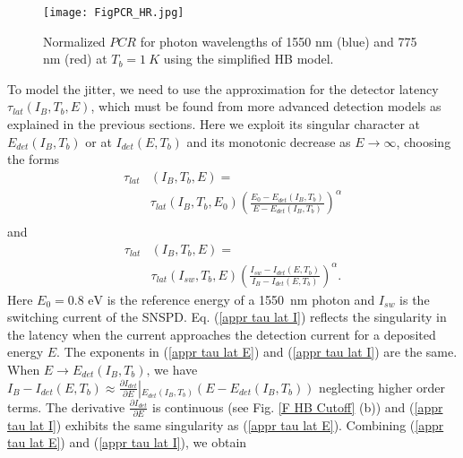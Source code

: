 \documentclass[%
reprint,
 amsmath,amssymb,
aps,
pra,
]{revtex4-1}
\begin{document}
\begin{figure} 
\texttt{[image: FigPCR\_HR.jpg]}
\caption{Normalized $PCR$ for photon wavelengths of 1550 nm (blue) and 775 nm (red) at \(T_b=1~K\) using the simplified HB model.}
\label{F HB PCR}
\end{figure}

\quad To model the jitter, we need to use the approximation for the detector latency 
\(\tau_{lat}\left(I_B,T_b,E\right)\), 
which must be found from more advanced detection models as explained in the previous sections. Here we exploit its singular character at
\(E_{det}\left(I_B,T_b\right)\)
or at 
\(I_{det}\left(E,T_b\right)\)
and its monotonic decrease as
\(E \rightarrow \infty\),
choosing the forms
\begin{equation}\label{appr tau lat E}
\begin{aligned}
\tau_{lat}&\left(I_B,T_b,E\right) = \\
&\tau_{lat}\left(I_B,T_b,E_0\right)\left(\frac{E_0-E_{det}\left(I_B,T_b\right)}{E-E_{det}\left(I_B,T_b\right)}\right)^\alpha \\
&{}
\end{aligned}
\end{equation}
and
\begin{equation}\label{appr tau lat I}
\begin{aligned}
\tau_{lat}&\left(I_B,T_b,E\right) = \\
&\tau_{lat}\left(I_{sw},T_b,E\right)\left(\frac{I_{sw}-I_{det}\left(E,T_b\right)}{I_B-I_{det}\left(E,T_b\right)}\right)^\alpha \text{.}
\end{aligned}
\end{equation}
Here
\(E_0 = 0.8\text{ eV}\) is the reference energy of a 1550~nm photon and \(I_{sw}\) is the switching current of the SNSPD.  Eq. (\ref{appr tau lat I}) reflects the singularity in the latency when the current approaches the detection current for a deposited energy \(E\). The exponents in (\ref{appr tau lat E}) and (\ref{appr tau lat I}) are the same. When 
\(E \rightarrow E_{det}\left(I_B, T_b\right)\text{,}\)
 we have 
\(I_B - I_{det}\left(E, T_b\right) \approx \frac{\partial I_{det}}{\partial E} \left|_{E_{det}\left(I_B,T_b\right)}\left(E - E_{det}\left(I_B, T_b\right)\right)\right. \)
neglecting higher order terms. The derivative $\displaystyle{\frac{\partial I_{det}}{\partial E}}$ is continuous (see Fig. \ref{F HB Cutoff} (b)) and (\ref{appr tau lat I}) exhibits the same singularity as (\ref{appr tau lat E}). Combining (\ref{appr tau lat E}) and (\ref{appr tau lat I}), we obtain
\end{document}
